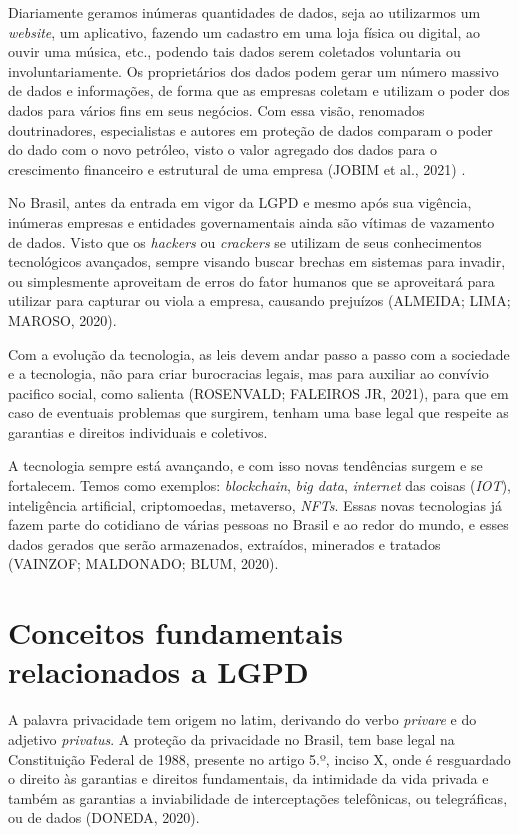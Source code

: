 \documentclass[
	12pt,				%
	openright,			%
	oneside,			%
	a4paper,			%
	english,			%
	french,				%
	spanish,			%
	brazil,				%
	]{abntex2}
\begin{document}
Diariamente geramos inúmeras quantidades de dados, seja ao utilizarmos um \textit{website}, um aplicativo, fazendo um cadastro em uma loja física ou digital, ao ouvir uma música, etc., podendo tais dados serem coletados voluntaria ou involuntariamente. Os proprietários dos dados podem gerar um número massivo de dados e informações, de forma que as empresas coletam e utilizam o poder dos dados para vários fins em seus negócios. Com essa visão, renomados doutrinadores, especialistas e autores em proteção de dados comparam o poder do dado com o novo petróleo, visto o valor agregado dos dados para o crescimento financeiro e estrutural de uma empresa (JOBIM et al., 2021) . 

No Brasil, antes da entrada em vigor da LGPD e mesmo após sua vigência, inúmeras empresas e entidades governamentais ainda são vítimas de vazamento de dados. Visto que os \textit{hackers} ou \textit{crackers} se utilizam de seus conhecimentos tecnológicos avançados, sempre visando buscar brechas em sistemas para invadir, ou simplesmente aproveitam de erros do fator humanos que se aproveitará para utilizar para capturar ou viola a empresa, causando prejuízos (ALMEIDA; LIMA; MAROSO, 2020).

Com a evolução da tecnologia, as leis devem andar passo a passo com a sociedade e a tecnologia, não para criar burocracias legais, mas para auxiliar ao convívio pacifico social, como salienta (ROSENVALD; FALEIROS JR, 2021), para que em caso de eventuais problemas que surgirem, tenham uma base legal que respeite as garantias e direitos individuais e coletivos. 

A tecnologia sempre está avançando, e com isso novas tendências surgem e se fortalecem. Temos como exemplos: \textit{blockchain}, \textit{big data}, \textit{internet} das coisas (\textit{IOT}), inteligência artificial, criptomoedas, metaverso, \textit{NFTs}. Essas novas tecnologias já fazem parte do cotidiano de várias pessoas no Brasil e ao redor do mundo, e esses dados gerados que serão armazenados, extraídos, minerados e tratados (VAINZOF; MALDONADO; BLUM, 2020).

\section{Conceitos fundamentais relacionados a LGPD }
A palavra privacidade tem origem no latim, derivando do verbo \textit{privare} e do adjetivo \textit{privatus}. A proteção da privacidade no Brasil, tem base legal na Constituição Federal de 1988, presente no artigo 5.º, inciso X, onde é resguardado o direito às garantias e direitos fundamentais, da intimidade da vida privada e também as garantias a inviabilidade de interceptações telefônicas, ou telegráficas, ou de dados (DONEDA, 2020).
\end{document}
